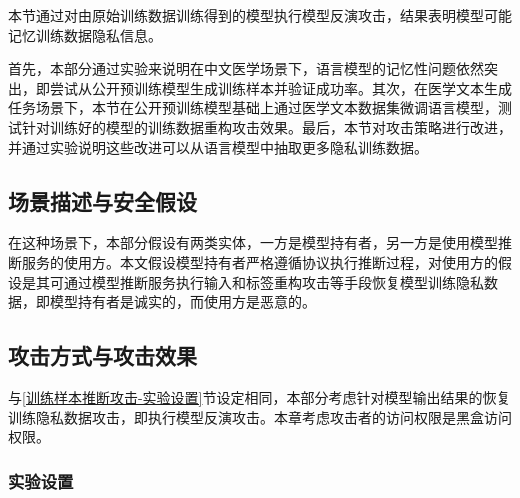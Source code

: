 本节通过对由原始训练数据训练得到的模型执行模型反演攻击，结果表明模型可能记忆训练数据隐私信息。


首先，本部分通过实验来说明在中文医学场景下，语言模型的记忆性问题依然突出，即尝试从公开预训练模型生成训练样本并验证成功率。其次，在医学文本生成任务场景下，本节在公开预训练模型基础上通过医学文本数据集微调语言模型，测试针对训练好的模型的训练数据重构攻击效果。最后，本节对攻击策略进行改进，并通过实验说明这些改进可以从语言模型中抽取更多隐私训练数据。

\subsection{场景描述与安全假设}


在这种场景下，本部分假设有两类实体，一方是模型持有者，另一方是使用模型推断服务的使用方。本文假设模型持有者严格遵循协议执行推断过程，对使用方的假设是其可通过模型推断服务执行输入和标签重构攻击等手段恢复模型训练隐私数据，即模型持有者是诚实的，而使用方是恶意的。

\subsection{攻击方式与攻击效果}


与\ref{训练样本推断攻击-实验设置}节设定相同，本部分考虑针对模型输出结果的恢复训练隐私数据攻击，即执行模型反演攻击。本章考虑攻击者的访问权限是黑盒访问权限。

\subsubsection{实验设置} \label{chap3_exp_setting}


